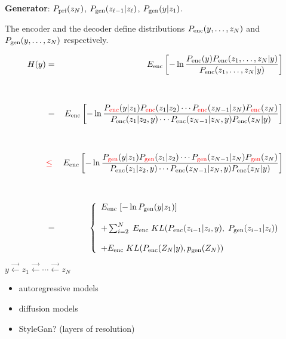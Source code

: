 {\vfill
{\bf Generator}: $P_{\mathrm{pri}}(z_N)$, $P_{\mathrm{gen}}(z_{\ell-1}|z_\ell)$, $P_{\mathrm{gen}}(y|z_1)$.

\vfill
The encoder and the decoder define distributions $P_{\mathrm{enc}}(y,\ldots,z_N)$ and $P_{\mathrm{gen}}(y,\ldots,z_N)$ respectively.


{\Large
\begin{eqnarray*}
H(y) & = & E_{\mathrm{enc}}\left[- \ln\frac{P_{\mathrm{enc}}(y)P_{\mathrm{enc}}(z_1,\ldots,z_N|y)}{P_{\mathrm{enc}}(z_1,\ldots,z_N|y)}\right]\\
  \\
  \\
  & = & E_{\mathrm{enc}}\left[ - \ln\frac{P_{\color{red} \mathrm{enc}}(y|z_1)P_{\color{red} \mathrm{enc}}(z_1|z_2)\cdots P_{\color{red} \mathrm{enc}}(z_{N-1}|z_N)P_{\color{red} \mathrm{enc}}(z_N)}
  {P_{\mathrm{enc}}(z_1|z_2,y)\cdots P_{\mathrm{enc}}(z_{N-1}|z_N,y)P_{\mathrm{enc}}(z_N|y)}\right] \\
   \\
   \\
  & {\color{red} \leq} & E_{\mathrm{enc}}\left[ - \ln\frac{P_{\color{red} \mathrm{gen}}(y|z_1)P_{\color{red} \mathrm{gen}}(z_1|z_2)\cdots P_{\color{red} \mathrm{gen}}(z_{N-1}|z_N)P_{\color{red} \mathrm{gen}}(z_N)}
  {P_{\mathrm{enc}}(z_1|z_2,y)\cdots P_{\mathrm{enc}}(z_{N-1}|z_N,y)P_{\mathrm{enc}}(z_N|y)}\right] \\
\\
\\
 & = & \left\{\begin{array}{l}E_{\mathrm{enc}}\;[-\ln P_{\mathrm{gen}}(y|z_1)]
                             \\ \\ + \sum_{i=2}^N  \; E_{\mathrm{enc}}\; KL(P_{\mathrm{enc}}(z_{i-1}|z_i,y),\;P_{\mathrm{gen}}(z_{i-1}|z_i)) \\
                             \\ + E_{\mathrm{enc}}\; KL(P_{\mathrm{enc}}(Z_N|y),p_{\mathrm{gen}}(Z_N))\end{array}\right.
\end{eqnarray*}
}


\centerline{$y \stackrel{\rightarrow}{\leftarrow} z_1  \stackrel{\rightarrow}{\leftarrow} \cdots \stackrel{\rightarrow}{\leftarrow} z_N$}

\vfill
\begin{itemize}
\item autoregressive models

\vfill
\item diffusion models

\vfill
\item StyleGan? (layers of resolution)


\end{itemize}}
